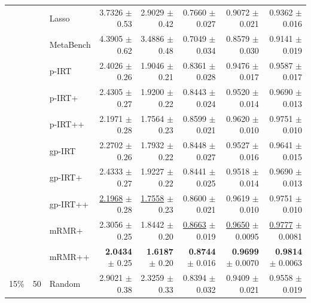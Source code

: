 \begin{longtable}{llp{}rrrrr}
 &  & Lasso & 3.7326 {\scriptsize $\pm$ 0.53} & 2.9029 {\scriptsize $\pm$ 0.42} & 0.7660 {\scriptsize $\pm$ 0.027} & 0.9072 {\scriptsize $\pm$ 0.021} & 0.9362 {\scriptsize $\pm$ 0.016} \\
 &  & MetaBench & 4.3905 {\scriptsize $\pm$ 0.62} & 3.4886 {\scriptsize $\pm$ 0.48} & 0.7049 {\scriptsize $\pm$ 0.034} & 0.8579 {\scriptsize $\pm$ 0.030} & 0.9141 {\scriptsize $\pm$ 0.019} \\
 &  & p-IRT & 2.4026 {\scriptsize $\pm$ 0.26} & 1.9046 {\scriptsize $\pm$ 0.21} & 0.8361 {\scriptsize $\pm$ 0.028} & 0.9476 {\scriptsize $\pm$ 0.017} & 0.9587 {\scriptsize $\pm$ 0.017} \\
 &  & p-IRT+ & 2.4305 {\scriptsize $\pm$ 0.27} & 1.9200 {\scriptsize $\pm$ 0.22} & 0.8443 {\scriptsize $\pm$ 0.024} & 0.9520 {\scriptsize $\pm$ 0.014} & 0.9690 {\scriptsize $\pm$ 0.013} \\
 &  & p-IRT++ & 2.1971 {\scriptsize $\pm$ 0.28} & 1.7564 {\scriptsize $\pm$ 0.23} & 0.8599 {\scriptsize $\pm$ 0.021} & 0.9620 {\scriptsize $\pm$ 0.010} & 0.9751 {\scriptsize $\pm$ 0.010} \\
 &  & gp-IRT & 2.2702 {\scriptsize $\pm$ 0.26} & 1.7932 {\scriptsize $\pm$ 0.22} & 0.8448 {\scriptsize $\pm$ 0.027} & 0.9527 {\scriptsize $\pm$ 0.016} & 0.9641 {\scriptsize $\pm$ 0.015} \\
 &  & gp-IRT+ & 2.4333 {\scriptsize $\pm$ 0.27} & 1.9227 {\scriptsize $\pm$ 0.22} & 0.8441 {\scriptsize $\pm$ 0.025} & 0.9518 {\scriptsize $\pm$ 0.014} & 0.9690 {\scriptsize $\pm$ 0.013} \\
 &  & gp-IRT++ & \underline{2.1968} {\scriptsize $\pm$ 0.28} & \underline{1.7558} {\scriptsize $\pm$ 0.23} & 0.8600 {\scriptsize $\pm$ 0.021} & 0.9619 {\scriptsize $\pm$ 0.010} & 0.9751 {\scriptsize $\pm$ 0.010} \\
 &  & mRMR+ & 2.3056 {\scriptsize $\pm$ 0.25} & 1.8442 {\scriptsize $\pm$ 0.20} & \underline{0.8663} {\scriptsize $\pm$ 0.019} & \underline{0.9650} {\scriptsize $\pm$ 0.0095} & \underline{0.9777} {\scriptsize $\pm$ 0.0081} \\
 &  & mRMR++ & \textbf{2.0434} {\scriptsize $\pm$ 0.25} & \textbf{1.6187} {\scriptsize $\pm$ 0.20} & \textbf{0.8744} {\scriptsize $\pm$ 0.016} & \textbf{0.9699} {\scriptsize $\pm$ 0.0070} & \textbf{0.9814} {\scriptsize $\pm$ 0.0063} \\
\midrule
15\% & 50 & Random & 2.9021 {\scriptsize $\pm$ 0.38} & 2.3259 {\scriptsize $\pm$ 0.33} & 0.8394 {\scriptsize $\pm$ 0.032} & 0.9409 {\scriptsize $\pm$ 0.021} & 0.9558 {\scriptsize $\pm$ 0.019} \\

\end{longtable}
